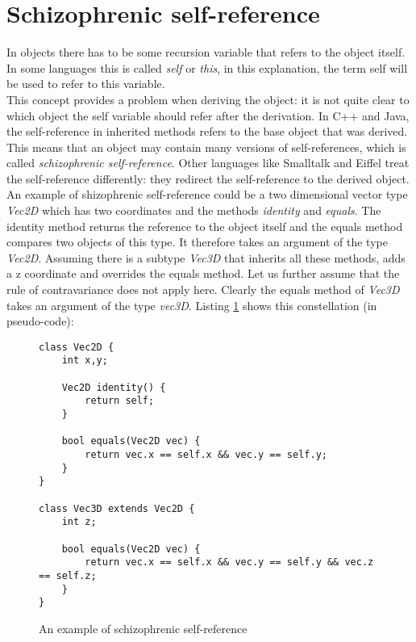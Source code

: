 \section{Schizophrenic self-reference}

In objects there has to be some recursion variable that refers to the
object itself. In some languages this is called \emph{self} or \emph{this}, in
this explanation, the term self will be used to refer to this variable. \\

This concept provides a problem when deriving the object: it is not
quite clear to which object the self variable should refer after the derivation.
In C++ and Java, the self-reference in inherited methods refers to the base
object that was derived. This means that an object may contain many versions
of self-references, which is called \emph{schizophrenic self-reference}. Other
languages like Smalltalk and Eiffel treat the self-reference differently: they
redirect the self-reference to the derived object. \\

An example of shizophrenic self-reference could be a two dimensional
vector type \emph{Vec2D} which has two coordinates and the methods
\emph{identity} and \emph{equals}. The identity method returns the
reference to the object itself and the equals method compares two objects
of this type. It therefore takes an argument of the type \emph{Vec2D}. Assuming
there is a subtype \emph{Vec3D} that inherits all these methods, adds a z
coordinate and overrides the equals method. Let us further assume that the rule
of contravariance does not apply here. Clearly the equals method of \emph{Vec3D}
takes an argument of the type \emph{vec3D}. Listing \ref{fig:schizoListing} 
shows this constellation (in pseudo-code):

\begin{figure}[H]
\begin{lstlisting}
class Vec2D {
	int x,y;

	Vec2D identity() {
		return self;
	}

	bool equals(Vec2D vec) {
		return vec.x == self.x && vec.y == self.y;
	}
}

class Vec3D extends Vec2D {
	int z;

	bool equals(Vec2D vec) {
		return vec.x == self.x && vec.y == self.y && vec.z == self.z;
	}
}
\end{lstlisting}
\caption{An example of schizophrenic self-reference}
\label{fig:schizoListing}
\end{figure}

